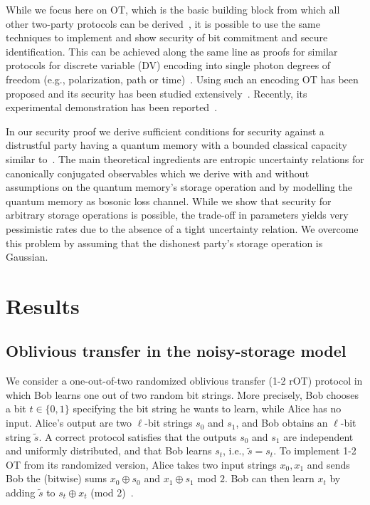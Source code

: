 \documentclass[aps,amsfonts,twoside,amssymb,superscriptaddress,twocolumn]{revtex4-1}
\begin{document}
While we focus here on OT, which is the basic building block from which all other two-party protocols can be derived~\cite{kilian1988founding}, it is possible to use the same techniques to implement and show security of bit commitment and secure identification.
This can be achieved along the same line as proofs for similar protocols for discrete variable (DV) encoding into single photon degrees of freedom (e.g., polarization, path or time)~\cite{Wehner2010,ng2012}. 
Using such an encoding OT has been proposed and its security has been studied extensively~\cite{damgaard2008,damgaard2007,wehner2008,Koenig2012,Berta2012,berta2013, Dupuis2015}. 
Recently, its experimental demonstration has been reported~\cite{ng2012,erven2014experimental}. 

In our security proof we derive sufficient conditions for security against a distrustful party having a quantum memory with a bounded classical capacity similar to~\cite{Koenig2012}.
The main theoretical ingredients are entropic uncertainty relations for canonically conjugated observables which we derive with and without assumptions on the quantum memory's storage operation and by modelling the quantum memory as bosonic loss channel. 
While we show that security for arbitrary storage operations is possible, the trade-off in parameters yields very pessimistic rates due to the absence of a tight uncertainty relation.
We overcome this problem by assuming that the dishonest party's storage operation is Gaussian.
 

\section{Results}

\subsection{ Oblivious transfer in the noisy-storage model}\label{sec:OTProtocol}
We consider a one-out-of-two randomized oblivious transfer (1-2 rOT) protocol in which Bob learns one out of two random bit strings. 
More precisely, Bob chooses a bit $t\in \{0,1\}$ specifying the bit string he wants to learn, while Alice has no input. Alice's output are two $\ell$-bit strings $s_0$ and $s_1$, and Bob obtains an $\ell$-bit string $\tilde s$. A correct protocol satisfies that the outputs $s_0$ and $s_1$ are independent and uniformly distributed, and that Bob learns $s_t$, i.e., $\tilde s = s_t$. To implement 1-2 OT from its randomized version, Alice takes two input strings $x_0,x_1$ and sends Bob the (bitwise) sums $x_0 \oplus s_0$ and $x_1\oplus s_1$ mod $2$. Bob can then learn $x_t$ by adding $\tilde s$ to $ s_t \oplus x_t$ (mod 2)~\cite{Koenig2012}.  
\end{document}

